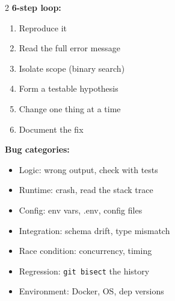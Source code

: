 \documentclass[11pt, letterpaper]{article}
\begin{document}
\begin{tcolorbox}[colback=part3bg, colframe=sectionpurple,
  title={\bfseries Debugging Process \& Bug Types}, arc=3pt, boxrule=1pt]
\footnotesize
\begin{multicols}{2}
\textbf{6-step loop:}
\begin{enumerate}[noitemsep, leftmargin=*, label=\arabic*.]
  \item Reproduce it
  \item Read the full error message
  \item Isolate scope (binary search)
  \item Form a testable hypothesis
  \item Change one thing at a time
  \item Document the fix
\end{enumerate}
\columnbreak
\textbf{Bug categories:}
\begin{itemize}[noitemsep, leftmargin=*]
  \item Logic: wrong output, check with tests
  \item Runtime: crash, read the stack trace
  \item Config: env vars, .env, config files
  \item Integration: schema drift, type mismatch
  \item Race condition: concurrency, timing
  \item Regression: \texttt{git bisect} the history
  \item Environment: Docker, OS, dep versions
\end{itemize}
\end{multicols}
\end{tcolorbox}

\vspace{4pt}
\end{document}
